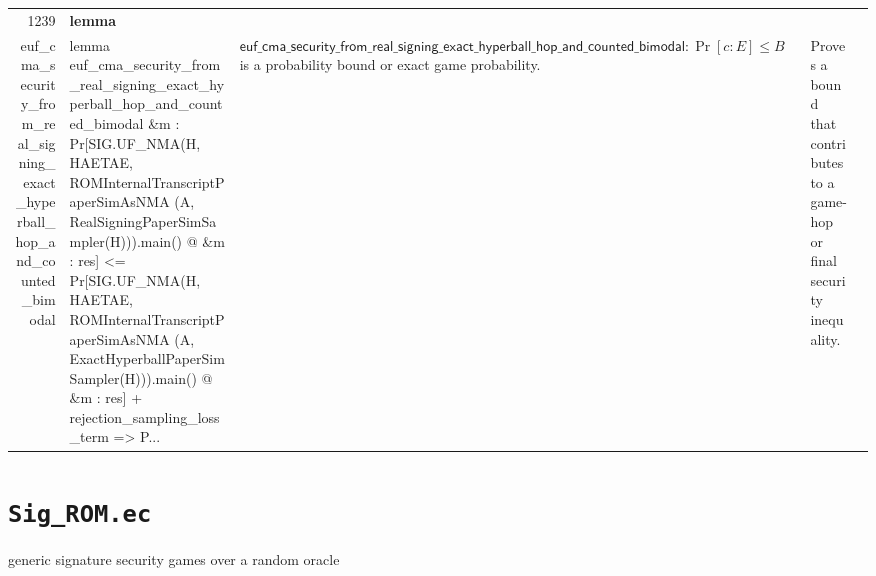 \documentclass[10pt]{article}
\newcommand{\ec}[1]{\begingroup\ttfamily\scriptsize #1\endgroup}
\begin{document}
\begin{longtable}{r L{0.17\textwidth} L{0.26\textwidth} L{0.27\textwidth} L{0.20\textwidth}}
1239 & \textbf{lemma}\\\ec{euf\_cma\_security\_from\_real\_signing\_exact\_hyperball\_hop\_and\_counted\_bimodal} & \ec{lemma euf\_cma\_security\_from\_real\_signing\_exact\_hyperball\_hop\_and\_counted\_bimodal \&m : Pr[SIG.UF\_NMA(H, HAETAE, ROMInternalTranscriptPaperSimAsNMA (A, RealSigningPaperSimSampler(H))).main() @ \&m : res] <= Pr[SIG.UF\_NMA(H, HAETAE, ROMInternalTranscriptPaperSimAsNMA (A, ExactHyperballPaperSimSampler(H))).main() @ \&m : res] + rejection\_sampling\_loss\_term => P...} & \(\mathsf{euf\_cma\_security\_from\_real\_signing\_exact\_hyperball\_hop\_and\_counted\_bimodal} : \Pr[c : E] \le B\) is a probability bound or exact game probability. & Proves a bound that contributes to a game-hop or final security inequality. \\
\bottomrule
\end{longtable}

\clearpage
\section{\texorpdfstring{\texttt{Sig\_ROM.ec}}{Sig ROM.ec}}
generic signature security games over a random oracle
\end{document}
